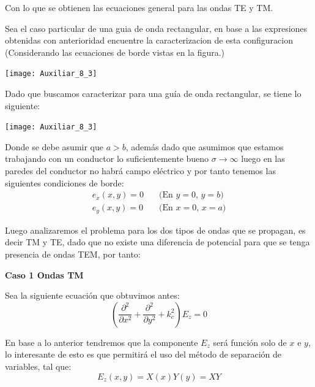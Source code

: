 \documentclass[
  11pt,
  letterpaper,
   addpoints,
   answers
  ]{exam}
\begin{document}
\begin{questions}
\begin{solution}
Con lo que se obtienen las ecuaciones general para las ondas TE y TM.

    \end{solution}
    \question  Sea el caso particular de una guia de onda rectangular, en base a las expresiones obtenidas con anterioridad encuentre la caracterizacion de esta configuracion (Considerando las ecuaciones de borde vistas en la figura.)
    \begin{center}
        \texttt{[image: Auxiliar\_8\_3]}
      \end{center}
    \begin{solution}
        Dado que buscamos caracterizar para una guía de onda rectangular, se tiene lo siguiente:

\begin{center}
    \texttt{[image: Auxiliar\_8\_3]}
\end{center}

Donde se debe asumir que $a > b$, además dado que asumimos que estamos trabajando con un conductor lo suficientemente bueno $\sigma \to \infty$ luego en las paredes del conductor no habrá campo eléctrico y por tanto tenemos las siguientes condiciones de borde:
\begin{align}
    e_x(x, y) = 0 \quad &\text{(En $y=0$, $y=b$)} \tag{26} \\
    e_y(x, y) = 0 \quad &\text{(En $x=0$, $x=a$)} \tag{27}
\end{align}

Luego analizaremos el problema para los dos tipos de ondas que se propagan, es decir TM y TE, dado que no existe una diferencia de potencial para que se tenga presencia de ondas TEM, por tanto:

\textbf{Caso 1 Ondas TM}

Sea la siguiente ecuación que obtuvimos antes:
\begin{equation}
    \left( \frac{\partial^2}{\partial x^2} + \frac{\partial^2}{\partial y^2} + k_c^2 \right) E_z = 0 \tag{28}
\end{equation}

En base a lo anterior tendremos que la componente $E_z$ será función solo de $x$ e $y$, lo interesante de esto es que permitirá el uso del método de separación de variables, tal que:
\begin{equation}
    E_z(x, y) = X(x)Y(y) = XY \tag{29}
\end{equation}


\end{solution}
\end{questions}
\end{document}

